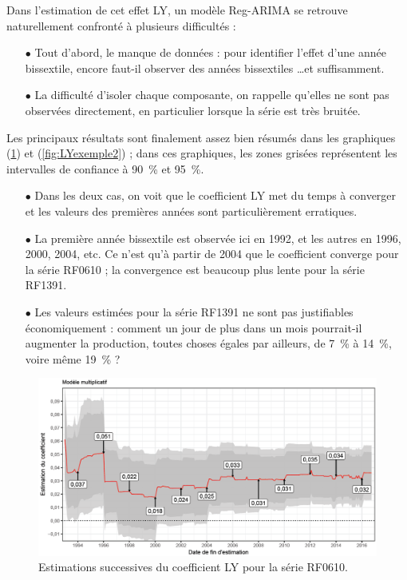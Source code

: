 \documentclass[12pt, a4paper, french]{article}
\begin{document}
Dans l'estimation de cet effet LY, un modèle Reg-ARIMA se retrouve naturellement confronté à plusieurs difficultés :
\begin{itemize}
	\item[$\bullet$] Tout d'abord, le manque de données : pour identifier l'effet d'une année bissextile, encore faut-il observer des années bissextiles \dots et suffisamment.
	\item[$\bullet$] La difficulté d'isoler chaque composante, on rappelle qu'elles ne sont pas observées directement, en particulier lorsque la série est très bruitée.
\end{itemize}

Les principaux résultats sont finalement assez bien résumés dans les graphiques (\ref{fig:LYexemple1}) et (\ref{fig:LYexemple2}) ; dans ces graphiques, les zones grisées représentent les intervalles de confiance à 90~\% et 95~\%.
\begin{itemize}
	\item[$\bullet$] Dans les deux cas, on voit que le coefficient LY met du temps à converger et les valeurs des premières années sont particulièrement erratiques.
	\item[$\bullet$] La première année bissextile est observée ici en 1992, et les autres en 1996, 2000, 2004, etc. Ce n'est qu'à partir de 2004 que le coefficient converge pour la série RF0610 ; la convergence est beaucoup plus lente pour la série RF1391.
	\item[$\bullet$] Les valeurs estimées pour la série RF1391 ne sont pas justifiables économiquement : comment un jour de plus dans un mois pourrait-il augmenter la production, toutes choses égales par ailleurs, de 7~\% à 14~\%, voire même 19~\% ?
\end{itemize}


\begin{figure}[!ht]
\begin{center}
 \includegraphics[scale=0.50]{img/LYexemple1.png}
 \caption{Estimations successives du coefficient LY pour la série RF0610.}
 \label{fig:LYexemple1}
\end{center}
\end{figure}
\end{document}
